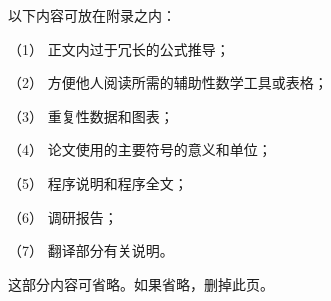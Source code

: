 \setlength{\baselineskip}{20pt}
\begin{appendices}

    以下内容可放在附录之内：

    （1） 正文内过于冗长的公式推导；
    
    （2） 方便他人阅读所需的辅助性数学工具或表格；
    
    （3） 重复性数据和图表；
    
    （4） 论文使用的主要符号的意义和单位；
    
    （5） 程序说明和程序全文；
    
    （6） 调研报告；
    
    （7） 翻译部分有关说明。
    
    这部分内容可省略。如果省略，删掉此页。


\end{appendices}

 